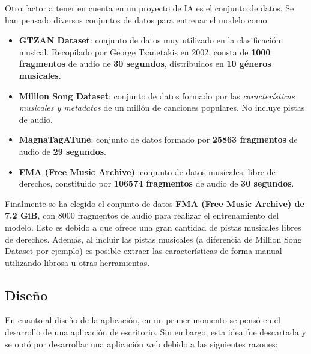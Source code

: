 Otro factor a tener en cuenta en un proyecto de IA es el conjunto de datos. Se han pensado diversos conjuntos de datos para entrenar el modelo como:
\begin{itemize}

\item \textbf{GTZAN Dataset}: conjunto de datos muy utilizado en la clasificación musical. Recopilado por George Tzanetakis en 2002, consta de \textbf{1000 fragmentos} de audio de \textbf{30 segundos}, distribuidos en \textbf{10 géneros musicales}.

\item \textbf{Million Song Dataset}: conjunto de datos formado por las \textit{características musicales y metadatos} de un millón de canciones populares. No incluye pistas de audio.

\item \textbf{MagnaTagATune}: conjunto de datos formado por \textbf{25863 fragmentos} de audio de \textbf{29 segundos}.

\item \textbf{FMA (Free Music Archive)}: conjunto de datos musicales, libre de derechos, constituido por \textbf{106574 fragmentos} de audio de \textbf{30 segundos}. 

\end{itemize}

Finalmente se ha elegido el conjunto de datos \textbf{FMA (Free Music Archive) de 7.2 GiB}, con 8000 fragmentos de audio para realizar el entrenamiento del modelo. Esto es debido a que ofrece una gran cantidad de pistas musicales libres de derechos. Además, al incluir las pistas musicales (a diferencia de Million Song Dataset por ejemplo)
es posible extraer las características de forma manual utilizando librosa u otras herramientas.

\subsection{Diseño}

En cuanto al diseño de la aplicación, en un primer momento se pensó en el desarrollo de una aplicación de escritorio. Sin embargo, esta idea fue descartada y se optó por desarrollar una aplicación web debido a las siguientes razones:

